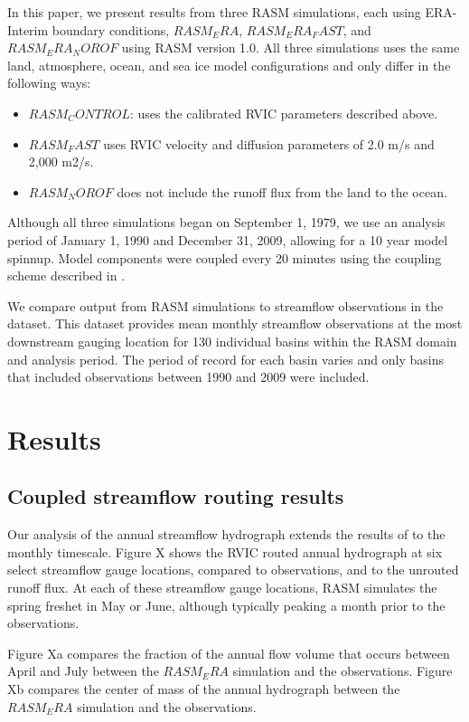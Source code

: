 \documentclass[jgrga, draft]{agutex}
\begin{document}
\begin{article}
In this paper, we present results from three RASM simulations, each using ERA-Interim boundary conditions, $RASM_ERA$, $RASM_ERA_FAST$, and $RASM_ERA_NOROF$ using RASM version 1.0.
All three simulations uses the same land, atmosphere, ocean, and sea ice model configurations and only differ in the following ways:
\begin{itemize}
\item $RASM_CONTROL$: uses the calibrated RVIC parameters described above.
\item $RASM_FAST$ uses RVIC velocity and diffusion parameters of 2.0 m/s and 2,000 m2/s.
\item $RASM_NOROF$ does not include the runoff flux from the land to the ocean.
\end{itemize}

Although all three simulations began on September 1, 1979, we use an analysis period of January 1, 1990 and December 31, 2009, allowing for a 10 year model spinnup.
Model components were coupled every 20 minutes using the coupling scheme described in \citep{Roberts_2015a}.

We compare output from RASM simulations to streamflow observations in the \citet{Dai_2009} dataset.
This dataset provides mean monthly streamflow observations at the most downstream gauging location for 130 individual basins within the RASM domain and analysis period.
The period of record for each basin varies and only basins that included observations between 1990 and 2009 were included.

\section{Results}

\subsection{Coupled streamflow routing results}

Our analysis of the annual streamflow hydrograph extends the results of \citet{Hamman_2015} to the monthly timescale.
Figure X shows the RVIC routed annual hydrograph at six select streamflow gauge locations, compared to observations, and to the unrouted runoff flux.
At each of these streamflow gauge locations, RASM simulates the spring freshet in May or June, although typically peaking a month prior to the observations.

Figure Xa compares the fraction of the annual flow volume that occurs between April and July between the $RASM_ERA$ simulation and the observations.
Figure Xb compares the center of mass of the annual hydrograph between the $RASM_ERA$ simulation and the observations.


\end{article}
\end{document}
